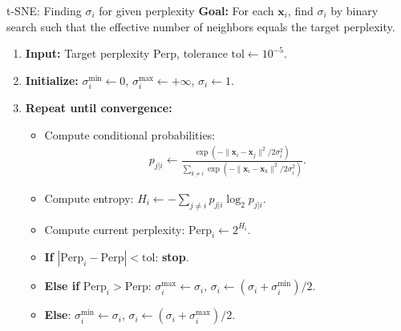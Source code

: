 \documentclass{beamer}
\begin{document}
\begin{frame}{t-SNE: Finding $\sigma_i$ for given perplexity}
  \textbf{Goal:} For each $\mathbf{x}_i$, find $\sigma_i$ by
  \alert{binary search} such that the effective number of neighbors
  equals the target perplexity.
  \vspace{0.3cm}
  \begin{enumerate}
  \item \textbf{Input:} Target perplexity $\text{Perp}$, tolerance $\text{tol} \leftarrow 10^{-5}$.
  \item \textbf{Initialize:} $\sigma_i^{\min} \leftarrow 0$, $\sigma_i^{\max} \leftarrow +\infty$, $\sigma_i \leftarrow 1$.
  \item \textbf{Repeat until convergence:}
    \begin{itemize}
    \item Compute conditional probabilities:
      \begin{align*}
        p_{j|i} \leftarrow \frac{\exp(-\|\mathbf{x}_i - \mathbf{x}_j\|^2 / 2\sigma_i^2)}{\sum_{k \neq i} \exp(-\|\mathbf{x}_i - \mathbf{x}_k\|^2 / 2\sigma_i^2)}.
      \end{align*}
    \item Compute entropy: $H_i \leftarrow -\sum_{j \neq i} p_{j|i} \log_2 p_{j|i}$.
    \item Compute current perplexity: $\text{Perp}_i \leftarrow 2^{H_i}$.
    \item \textbf{If} $|\text{Perp}_i - \text{Perp}| < \text{tol}$: \textbf{stop}.
    \item \textbf{Else if} $\text{Perp}_i > \text{Perp}$: $\sigma_i^{\max} \leftarrow \sigma_i$, $\sigma_i \leftarrow (\sigma_i + \sigma_i^{\min})/2$.
    \item \textbf{Else}: $\sigma_i^{\min} \leftarrow \sigma_i$, $\sigma_i \leftarrow (\sigma_i + \sigma_i^{\max})/2$.
    \end{itemize}
  \end{enumerate}  
\end{frame}
\end{document}
